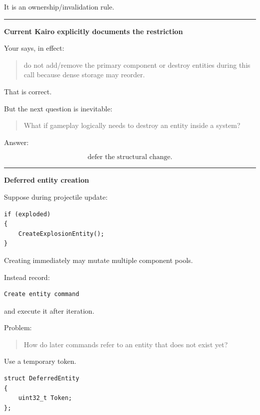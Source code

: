 It is an ownership/invalidation rule.

\begin{center}\rule{0.5\linewidth}{0.5pt}\end{center}

\textbf{Current Kairo explicitly documents the restriction}

Your  says, in effect:

\begin{quote}
do not add/remove the primary component or destroy entities during this call because dense storage may reorder.
\end{quote}

That is correct.

But the next question is inevitable:

\begin{quote}
What if gameplay logically needs to destroy an entity inside a system?
\end{quote}

Answer:

\[
\boxed{
\text{defer the structural change}.
}
\]

\begin{center}\rule{0.5\linewidth}{0.5pt}\end{center}

\textbf{Deferred entity creation}

Suppose during projectile update:

\begin{verbatim}
if (exploded)
{
    CreateExplosionEntity();
}
\end{verbatim}

Creating immediately may mutate multiple component pools.

Instead record:

\begin{verbatim}
Create entity command
\end{verbatim}

and execute it after iteration.

Problem:

\begin{quote}
How do later commands refer to an entity that does not exist yet?
\end{quote}

Use a temporary token.

\begin{verbatim}
struct DeferredEntity
{
    uint32_t Token;
};
\end{verbatim}

